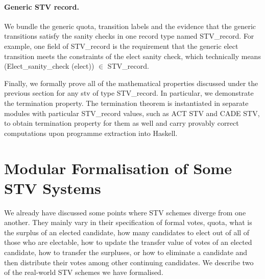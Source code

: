 \documentclass{llncs}
\begin{document}
\paragraph{Generic STV record.} We bundle the generic quota,  transition labels and the evidence that the generic transitions satisfy the sanity checks in one record type named {\selectfont STV\_record}. For example, one field of {\selectfont STV\_record} is the requirement that the generic elect transition meets the constraints of the elect sanity check, which technically means ({\selectfont Elect\_sanity\_check (elect)}) $\in$ {\selectfont STV\_record}. 


Finally, we formally prove all of the mathematical properties discussed under the previous section for any {\selectfont stv} of type {\selectfont STV\_record}. In particular, we demonstrate the termination property. The termination theorem is instantiated in separate modules with particular {\selectfont STV\_record} values, such as ACT STV and CADE STV, to obtain termination property for them as well and carry provably correct computations upon programme extraction into Haskell.
\section{Modular Formalisation of Some STV Systems}
We already have discussed some points where STV schemes diverge from one another. They mainly vary in their specification of formal votes, quota, what is the surplus of an elected candidate, how many candidates to elect out of all of those who are electable, how to update the transfer value of votes of an elected candidate, how to transfer the surpluses, or how to eliminate a candidate and then distribute their votes among other continuing candidates.
%
We describe two of the real-world STV schemes we have formalised. 
  
\end{document}
